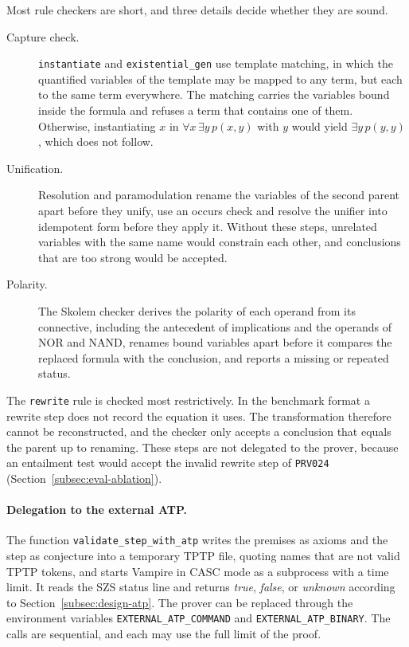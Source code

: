 Most rule checkers are short, and three details decide whether they are sound.
\begin{description}
  \item[Capture check.] \texttt{instantiate} and \texttt{existential\_gen} use template matching, in which the quantified variables of the template may be mapped to any term, but each to the same term everywhere. The matching carries the variables bound inside the formula and refuses a term that contains one of them. Otherwise, instantiating $x$ in $\forall x\,\exists y\,p(x,y)$ with $y$ would yield $\exists y\,p(y,y)$, which does not follow.
  \item[Unification.] Resolution and paramodulation rename the variables of the second parent apart before they unify, use an occurs check and resolve the unifier into idempotent form before they apply it. Without these steps, unrelated variables with the same name would constrain each other, and conclusions that are too strong would be accepted.
  \item[Polarity.] The Skolem checker derives the polarity of each operand from its connective, including the antecedent of implications and the operands of NOR and NAND, renames bound variables apart before it compares the replaced formula with the conclusion, and reports a missing or repeated status.
\end{description}
The \texttt{rewrite} rule is checked most restrictively.
In the benchmark format a rewrite step does not record the equation it uses. The transformation therefore cannot be reconstructed, and the checker only accepts a conclusion that equals the parent up to renaming.
These steps are not delegated to the prover, because an entailment test would accept the invalid rewrite step of \texttt{PRV024} (Section~\ref{subsec:eval-ablation}).

\paragraph{Delegation to the external ATP.}
\label{subsec:impl-atp}

The function \texttt{validate\_step\_with\_atp} writes the premises as axioms and the step as conjecture into a temporary TPTP file, quoting names that are not valid TPTP tokens, and starts Vampire in CASC mode as a subprocess with a time limit.
It reads the SZS status line and returns \emph{true}, \emph{false}, or \emph{unknown} according to Section~\ref{subsec:design-atp}.
The prover can be replaced through the environment variables \texttt{EXTERNAL\_ATP\_COMMAND} and \texttt{EXTERNAL\_ATP\_BINARY}.
The calls are sequential, and each may use the full limit of the proof.

